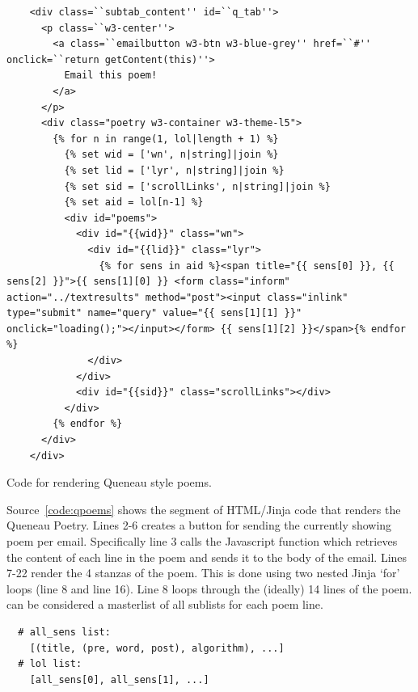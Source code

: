 \begin{listing}[h!]
  \begin{verbatim}
    <div class=``subtab_content'' id=``q_tab''>
      <p class=``w3-center''>
        <a class=``emailbutton w3-btn w3-blue-grey'' href=``#'' onclick=``return getContent(this)''>
          Email this poem!
        </a>
      </p>
      <div class="poetry w3-container w3-theme-l5">
        {% for n in range(1, lol|length + 1) %}
          {% set wid = ['wn', n|string]|join %}
          {% set lid = ['lyr', n|string]|join %}
          {% set sid = ['scrollLinks', n|string]|join %}
          {% set aid = lol[n-1] %}
          <div id="poems">
            <div id="{{wid}}" class="wn">
              <div id="{{lid}}" class="lyr">
                {% for sens in aid %}<span title="{{ sens[0] }}, {{ sens[2] }}">{{ sens[1][0] }} <form class="inform" action="../textresults" method="post"><input class="inlink" type="submit" name="query" value="{{ sens[1][1] }}" onclick="loading();"></input></form> {{ sens[1][2] }}</span>{% endfor %}
              </div>
            </div>
            <div id="{{sid}}" class="scrollLinks"></div>
          </div>
        {% endfor %}
      </div>
    </div>
  \end{verbatim}
\caption{Code for rendering Queneau style poems.}
\label{code:qpoems}
\end{listing}

Source~\ref{code:qpoems} shows the segment of HTML/Jinja code that renders the Queneau Poetry. Lines 2-6 creates a button for sending the currently showing poem per email. Specifically line \num{3} calls the Javascript function  which retrieves the content of each line in the poem and sends it to the body of the email. Lines \num{7}-\num{22} render the \num{4} stanzas of the poem. This is done using two nested Jinja `for' loops (line \num{8} and line \num{16}). Line \num{8} loops through the (ideally) \num{14} lines of the poem.  can be considered a masterlist of all sublists for each poem line.


\begin{verbatim}
  # all_sens list:
    [(title, (pre, word, post), algorithm), ...]
  # lol list:
    [all_sens[0], all_sens[1], ...]
\end{verbatim}


